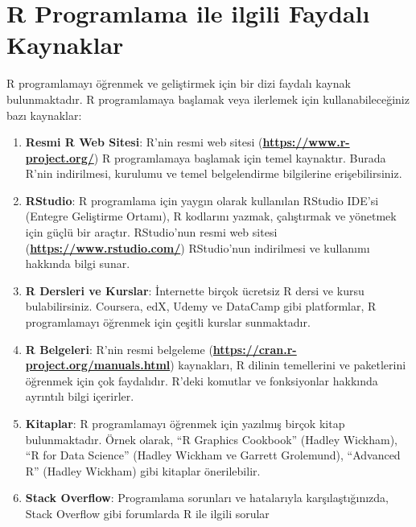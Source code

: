 \documentclass[
  letterpaper,
  DIV=11,
  numbers=noendperiod]{scrreprt}
\begin{document}
\hypertarget{r-programlama-ile-ilgili-faydalux131-kaynaklar}{%
\section*{R Programlama ile ilgili Faydalı
Kaynaklar}\label{r-programlama-ile-ilgili-faydalux131-kaynaklar}}


R programlamayı öğrenmek ve geliştirmek için bir dizi faydalı kaynak
bulunmaktadır. R programlamaya başlamak veya ilerlemek için
kullanabileceğiniz bazı kaynaklar:

\begin{enumerate}
\def\labelenumi{\arabic{enumi}.}
\item
  \textbf{Resmi R Web Sitesi}: R'nin resmi web sitesi
  (\href{https://www.r-project.org/}{\textbf{https://www.r-project.org/}})
  R programlamaya başlamak için temel kaynaktır. Burada R'nin
  indirilmesi, kurulumu ve temel belgelendirme bilgilerine
  erişebilirsiniz.
\item
  \textbf{RStudio}: R programlama için yaygın olarak kullanılan RStudio
  IDE'si (Entegre Geliştirme Ortamı), R kodlarını yazmak, çalıştırmak ve
  yönetmek için güçlü bir araçtır. RStudio'nun resmi web sitesi
  (\href{https://www.rstudio.com/}{\textbf{https://www.rstudio.com/}})
  RStudio'nun indirilmesi ve kullanımı hakkında bilgi sunar.
\item
  \textbf{R Dersleri ve Kurslar}: İnternette birçok ücretsiz R dersi ve
  kursu bulabilirsiniz. Coursera, edX, Udemy ve DataCamp gibi
  platformlar, R programlamayı öğrenmek için çeşitli kurslar
  sunmaktadır.
\item
  \textbf{R Belgeleri}: R'nin resmi belgeleme
  (\href{https://cran.r-project.org/manuals.html}{\textbf{https://cran.r-project.org/manuals.html}})
  kaynakları, R dilinin temellerini ve paketlerini öğrenmek için çok
  faydalıdır. R'deki komutlar ve fonksiyonlar hakkında ayrıntılı bilgi
  içerirler.
\item
  \textbf{Kitaplar}: R programlamayı öğrenmek için yazılmış birçok kitap
  bulunmaktadır. Örnek olarak, ``R Graphics Cookbook'' (Hadley Wickham),
  ``R for Data Science'' (Hadley Wickham ve Garrett Grolemund),
  ``Advanced R'' (Hadley Wickham) gibi kitaplar önerilebilir.
\item
  \textbf{Stack Overflow}: Programlama sorunları ve hatalarıyla
  karşılaştığınızda, Stack Overflow gibi forumlarda R ile ilgili sorular

\end{enumerate}
\end{document}
